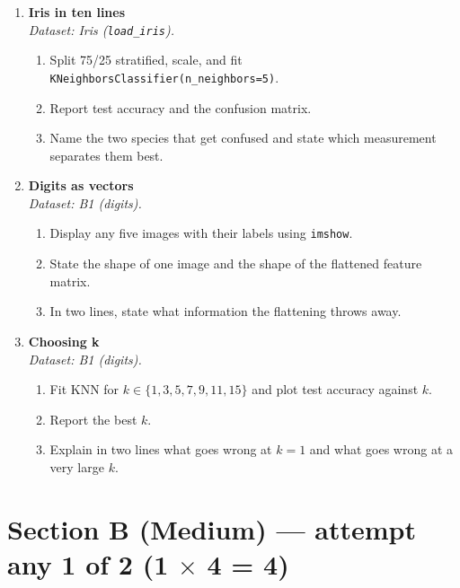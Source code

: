 \documentclass[11pt,a4paper]{article}
\begin{document}
\begin{enumerate}[label=\textbf{A\arabic*.}, leftmargin=*]

  \item \textbf{Iris in ten lines} \\
    \emph{Dataset: Iris (\texttt{load\_iris}).}
    \begin{enumerate}[label=(\alph*), leftmargin=*]
      \item Split 75/25 stratified, scale, and fit \texttt{KNeighborsClassifier(n\_neighbors=5)}.
      \item Report test accuracy and the confusion matrix.
      \item Name the two species that get confused and state which measurement separates them best.
    \end{enumerate}

  \item \textbf{Digits as vectors} \\
    \emph{Dataset: B1 (digits).}
    \begin{enumerate}[label=(\alph*), leftmargin=*]
      \item Display any five images with their labels using \texttt{imshow}.
      \item State the shape of one image and the shape of the flattened feature matrix.
      \item In two lines, state what information the flattening throws away.
    \end{enumerate}

  \item \textbf{Choosing k} \\
    \emph{Dataset: B1 (digits).}
    \begin{enumerate}[label=(\alph*), leftmargin=*]
      \item Fit KNN for $k \in \{1,3,5,7,9,11,15\}$ and plot test accuracy against $k$.
      \item Report the best $k$.
      \item Explain in two lines what goes wrong at $k=1$ and what goes wrong at a very large $k$.
    \end{enumerate}

\end{enumerate}

\section*{Section B (Medium) --- attempt any 1 of 2 \quad (1 $\times$ 4 = 4)}
\end{document}
